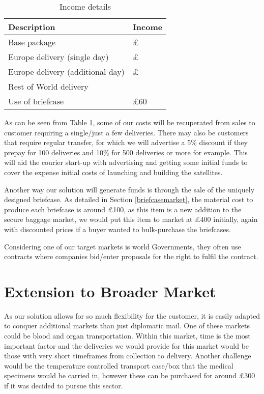 \begin{table}[H]
    \centering
    \begin{tabular}{|p{}|p{}|}
        \hline
        \textbf{Description} & \textbf{Income} \\
        \hline
        Base package & £ \\
        \hline
        Europe delivery (single day) & £ \\
        \hline
        Europe delivery (additional day) & £\\
        \hline
        Rest of World delivery & \\
        \hline
        Use of briefcase & £60\\
        \hline
    \end{tabular}
    \caption{Income details}
    \label{tab:customerPricing}
\end{table}

As can be seen from Table \ref{tab:customerPricing}, some of our costs will be recuperated from sales to customer requiring a single/just a few deliveries. There may also be customers that require regular transfer, for which we will advertise a 5\% discount if they prepay for 100 deliveries and 10\% for 500 deliveries or more for example. This will aid the courier start-up with advertising and getting some initial funds to cover the expense initial costs of launching and building the satellites.

Another way our solution will generate funds is through the sale of the uniquely designed briefcase. As detailed in Section \ref{briefcasemarket}, the material cost to produce each briefcase is around £100, as this item is a new addition to the secure baggage market, we would put this item to market at £400 initially, again with discounted prices if a buyer wanted to bulk-purchase the briefcases. 

Considering one of our target markets is world Governments, they often use contracts where companies bid/enter proposals for the right to fulfil the contract. 

\section{Extension to Broader Market}
As our solution allows for so much flexibility for the customer, it is easily adapted to conquer additional markets than just diplomatic mail. One of these markets could be blood and organ transportation. Within this market, time is the most important factor and the deliveries we would provide for this market would be those with very short timeframes from collection to delivery. Another challenge would be the temperature controlled transport case/box that the medical specimens would be carried in, however these can be purchased for around £300 \cite{courierCoolers} if it was decided to pursue this sector. 
